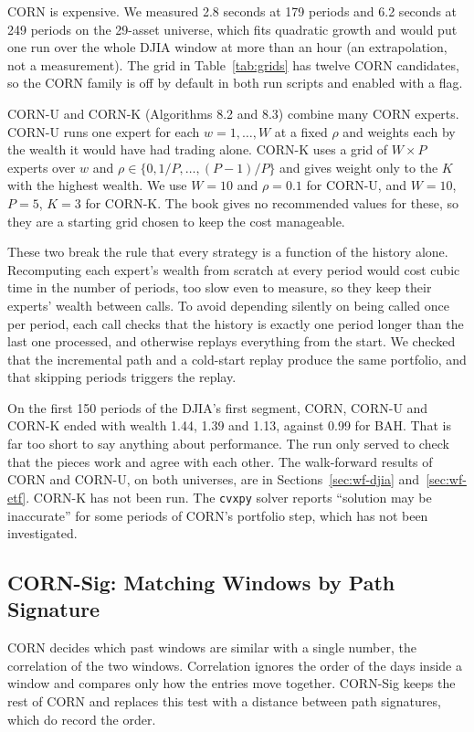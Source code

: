 \documentclass[11pt]{article}
\begin{document}
CORN is expensive. We measured 2.8 seconds at 179 periods and 6.2 seconds
at 249 periods on the 29-asset universe, which fits quadratic growth and
would put one run over the whole DJIA window at more than an hour (an
extrapolation, not a measurement). The grid in Table~\ref{tab:grids} has
twelve CORN candidates, so the CORN family is off by default in both run
scripts and enabled with a flag.

CORN-U and CORN-K (Algorithms 8.2 and 8.3) combine many CORN experts.
CORN-U runs one expert for each $w = 1, \dots, W$ at a fixed $\rho$ and
weights each by the wealth it would have had trading alone. CORN-K uses a
grid of $W \times P$ experts over $w$ and $\rho \in \{0, 1/P, \dots,
(P-1)/P\}$ and gives weight only to the $K$ with the highest wealth. We
use $W=10$ and $\rho=0.1$ for CORN-U, and $W=10$, $P=5$, $K=3$ for CORN-K.
The book gives no recommended values for these, so they are a starting
grid chosen to keep the cost manageable.

These two break the rule that every strategy is a function of the history
alone. Recomputing each expert's wealth from scratch at every period
would cost cubic time in the number of periods, too slow even to measure,
so they keep their experts' wealth between calls. To avoid depending
silently on being called once per period, each call checks that the
history is exactly one period longer than the last one processed, and
otherwise replays everything from the start. We checked that the
incremental path and a cold-start replay produce the same portfolio, and
that skipping periods triggers the replay.

On the first 150 periods of the DJIA's first segment, CORN, CORN-U and
CORN-K ended with wealth 1.44, 1.39 and 1.13, against 0.99 for BAH. That
is far too short to say anything about performance. The run only served to
check that the pieces work and agree with each other. The walk-forward
results of CORN and CORN-U, on both universes, are in
Sections~\ref{sec:wf-djia} and~\ref{sec:wf-etf}. CORN-K has not been run.
The \texttt{cvxpy} solver reports ``solution may be inaccurate'' for some
periods of CORN's portfolio step, which has not been investigated.

\subsection{CORN-Sig: Matching Windows by Path Signature}
\label{sec:corn-sig}

CORN decides which past windows are similar with a single number, the
correlation of the two windows. Correlation ignores the order of the days
inside a window and compares only how the entries move together. CORN-Sig
keeps the rest of CORN and replaces this test with a distance between
path signatures, which do record the order.
\end{document}
